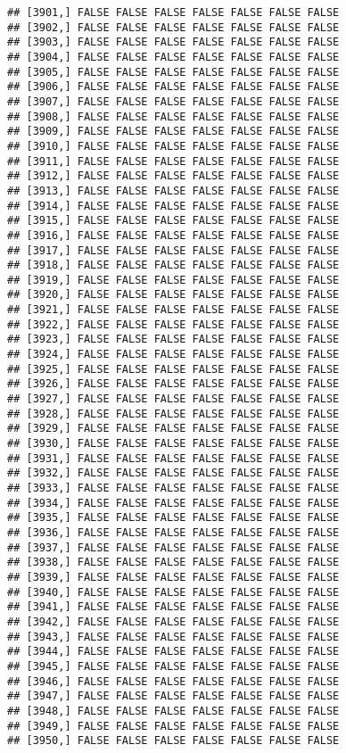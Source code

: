 \documentclass[
]{article}
\begin{document}
\begin{verbatim}
## [3901,] FALSE FALSE FALSE FALSE FALSE FALSE FALSE
## [3902,] FALSE FALSE FALSE FALSE FALSE FALSE FALSE
## [3903,] FALSE FALSE FALSE FALSE FALSE FALSE FALSE
## [3904,] FALSE FALSE FALSE FALSE FALSE FALSE FALSE
## [3905,] FALSE FALSE FALSE FALSE FALSE FALSE FALSE
## [3906,] FALSE FALSE FALSE FALSE FALSE FALSE FALSE
## [3907,] FALSE FALSE FALSE FALSE FALSE FALSE FALSE
## [3908,] FALSE FALSE FALSE FALSE FALSE FALSE FALSE
## [3909,] FALSE FALSE FALSE FALSE FALSE FALSE FALSE
## [3910,] FALSE FALSE FALSE FALSE FALSE FALSE FALSE
## [3911,] FALSE FALSE FALSE FALSE FALSE FALSE FALSE
## [3912,] FALSE FALSE FALSE FALSE FALSE FALSE FALSE
## [3913,] FALSE FALSE FALSE FALSE FALSE FALSE FALSE
## [3914,] FALSE FALSE FALSE FALSE FALSE FALSE FALSE
## [3915,] FALSE FALSE FALSE FALSE FALSE FALSE FALSE
## [3916,] FALSE FALSE FALSE FALSE FALSE FALSE FALSE
## [3917,] FALSE FALSE FALSE FALSE FALSE FALSE FALSE
## [3918,] FALSE FALSE FALSE FALSE FALSE FALSE FALSE
## [3919,] FALSE FALSE FALSE FALSE FALSE FALSE FALSE
## [3920,] FALSE FALSE FALSE FALSE FALSE FALSE FALSE
## [3921,] FALSE FALSE FALSE FALSE FALSE FALSE FALSE
## [3922,] FALSE FALSE FALSE FALSE FALSE FALSE FALSE
## [3923,] FALSE FALSE FALSE FALSE FALSE FALSE FALSE
## [3924,] FALSE FALSE FALSE FALSE FALSE FALSE FALSE
## [3925,] FALSE FALSE FALSE FALSE FALSE FALSE FALSE
## [3926,] FALSE FALSE FALSE FALSE FALSE FALSE FALSE
## [3927,] FALSE FALSE FALSE FALSE FALSE FALSE FALSE
## [3928,] FALSE FALSE FALSE FALSE FALSE FALSE FALSE
## [3929,] FALSE FALSE FALSE FALSE FALSE FALSE FALSE
## [3930,] FALSE FALSE FALSE FALSE FALSE FALSE FALSE
## [3931,] FALSE FALSE FALSE FALSE FALSE FALSE FALSE
## [3932,] FALSE FALSE FALSE FALSE FALSE FALSE FALSE
## [3933,] FALSE FALSE FALSE FALSE FALSE FALSE FALSE
## [3934,] FALSE FALSE FALSE FALSE FALSE FALSE FALSE
## [3935,] FALSE FALSE FALSE FALSE FALSE FALSE FALSE
## [3936,] FALSE FALSE FALSE FALSE FALSE FALSE FALSE
## [3937,] FALSE FALSE FALSE FALSE FALSE FALSE FALSE
## [3938,] FALSE FALSE FALSE FALSE FALSE FALSE FALSE
## [3939,] FALSE FALSE FALSE FALSE FALSE FALSE FALSE
## [3940,] FALSE FALSE FALSE FALSE FALSE FALSE FALSE
## [3941,] FALSE FALSE FALSE FALSE FALSE FALSE FALSE
## [3942,] FALSE FALSE FALSE FALSE FALSE FALSE FALSE
## [3943,] FALSE FALSE FALSE FALSE FALSE FALSE FALSE
## [3944,] FALSE FALSE FALSE FALSE FALSE FALSE FALSE
## [3945,] FALSE FALSE FALSE FALSE FALSE FALSE FALSE
## [3946,] FALSE FALSE FALSE FALSE FALSE FALSE FALSE
## [3947,] FALSE FALSE FALSE FALSE FALSE FALSE FALSE
## [3948,] FALSE FALSE FALSE FALSE FALSE FALSE FALSE
## [3949,] FALSE FALSE FALSE FALSE FALSE FALSE FALSE
## [3950,] FALSE FALSE FALSE FALSE FALSE FALSE FALSE

\end{verbatim}
\end{document}
